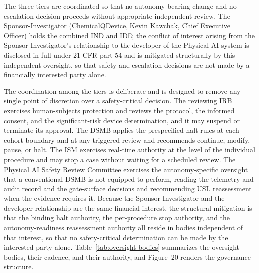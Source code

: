The three tiers are coordinated so that no autonomy-bearing change and no escalation
decision proceeds without appropriate independent review. The Sponsor-Investigator
(ChemicalQDevice, Kevin Kawchak, Chief Executive Officer) holds the combined IND and
IDE; the conflict of interest arising from the Sponsor-Investigator's relationship
to the developer of the Physical AI system is disclosed in full under 21 CFR part 54
and is mitigated structurally by this independent oversight, so that safety and
escalation decisions are not made by a financially interested party alone.

The coordination among the tiers is deliberate and is designed to remove any single
point of discretion over a safety-critical decision. The reviewing IRB exercises
human-subjects protection and reviews the protocol, the informed consent, and the
significant-risk device determination, and it may suspend or terminate its approval.
The DSMB applies the prespecified halt rules at each cohort boundary and at any
triggered review and recommends continue, modify, pause, or halt. The ISM exercises
real-time authority at the level of the individual procedure and may stop a case
without waiting for a scheduled review. The Physical AI Safety Review Committee
exercises the autonomy-specific oversight that a conventional DSMB is not equipped to
perform, reading the telemetry and audit record and the gate-surface decisions and
recommending USL reassessment when the evidence requires it. Because the
Sponsor-Investigator and the developer relationship are the same financial interest,
the structural mitigation is that the binding halt authority, the per-procedure stop
authority, and the autonomy-readiness reassessment authority all reside in bodies
independent of that interest, so that no safety-critical determination can be made
by the interested party alone. Table~\ref{tab:oversight-bodies} summarizes the
oversight bodies, their cadence, and their authority, and Figure~20 renders the
governance structure.

